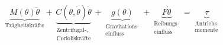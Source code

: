 \documentclass{article}
\begin{document}
	
\[
\underbrace{M(\theta)\ddot{\theta}}_{\mbox{Trägheitskräfte}} + \underbrace{C(\theta,\dot{\theta})\dot{\theta}}_{\begin{matrix}
	\mbox{Zentrifugal-,} \\ \mbox{Corioliskräfte} \end{matrix}}+\underbrace{g(\theta)}_{\begin{matrix}
	\mbox{Gravitations-} \\ \mbox{einfluss} \end{matrix}}+\underbrace{F\dot{\theta}}_{\begin{matrix}
	\mbox{Reibungs-} \\ \mbox{einfluss} \end{matrix}}=\underbrace{\tau}_{\begin{matrix}
	\mbox{Antriebs-} \\ \mbox{momente} \end{matrix}} 
\]
\end{document}

